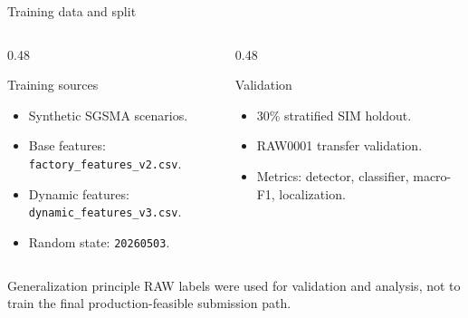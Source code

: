 \documentclass[10pt,aspectratio=169]{beamer}
\newcommand{\code}[1]{\texttt{\footnotesize #1}}
\begin{document}
\begin{frame}{Training data and split}
\small
\begin{columns}[T,totalwidth=\textwidth]
\begin{column}{0.48\textwidth}
\begin{block}{Training sources}
\begin{itemize}
  \item Synthetic SGSMA scenarios.
  \item Base features: \code{factory\_features\_v2.csv}.
  \item Dynamic features: \code{dynamic\_features\_v3.csv}.
  \item Random state: \code{20260503}.
\end{itemize}
\end{block}
\end{column}
\begin{column}{0.48\textwidth}
\begin{exampleblock}{Validation}
\begin{itemize}
  \item 30\% stratified SIM holdout.
  \item RAW0001 transfer validation.
  \item Metrics: detector, classifier, macro-F1, localization.
\end{itemize}
\end{exampleblock}
\end{column}
\end{columns}
\vspace{2mm}
\begin{alertblock}{Generalization principle}
RAW labels were used for validation and analysis, not to train the final production-feasible submission path.
\end{alertblock}
\end{frame}
\end{document}
